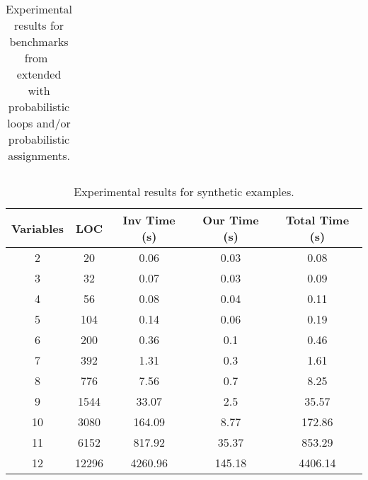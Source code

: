 \begin{center}
\begin{table}[]
\begin{tabular}{c|c|c|c|c|c}
\end{tabular}
\caption{Experimental results for benchmarks from~\cite{ADFG10:lexicographic} extended with probabilistic loops and/or probabilistic assignments.} \label{tab:exp1}
\end{table}
\end{center}

\begin{center}
\begin{table}[]
  \centering
   \begin{tabular}{c|c|c|c|c}

{Variables} & {LOC} & {Inv Time (s)} & {Our Time (s)} & {Total Time (s)} \\\hline \hline
{2} & {20} & {0.06} & {0.03} & {0.08} \\\hline
{3} & {32} & {0.07} & {0.03} & {0.09} \\\hline
{4} & {56} & {0.08} & {0.04} & {0.11} \\\hline
{5} & {104} & {0.14} & {0.06} & {0.19} \\\hline
{6} & {200} & {0.36} & {0.1} & {0.46} \\\hline
{7} & {392} & {1.31} & {0.3} & {1.61} \\\hline
{8} & {776} & {7.56} & {0.7} & {8.25} \\\hline
{9} & {1544} & {33.07} & {2.5} & {35.57} \\\hline
{10} & {3080} & {164.09} & {8.77} & {172.86} \\\hline
{11} & {6152} & {817.92} & {35.37} & {853.29} \\\hline
{12} & {12296} & {4260.96} & {145.18} & {4406.14} \\\hline
\end{tabular}
\caption{Experimental results for synthetic examples.}\label{tab:exp2}
\end{table}
\end{center}
